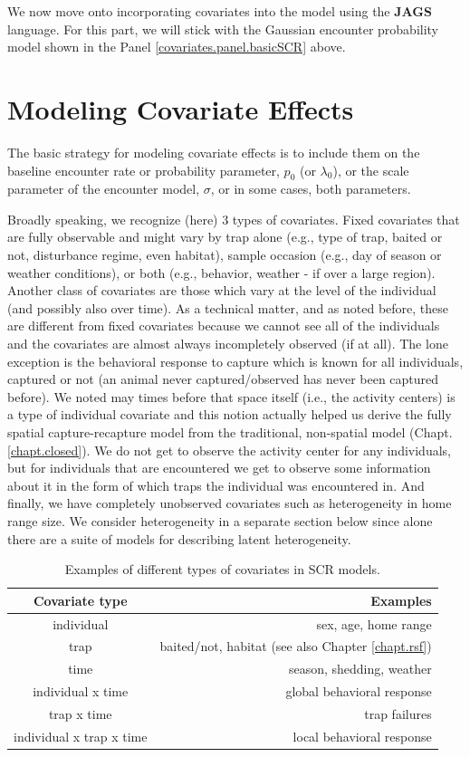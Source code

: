 We  now move onto incorporating
covariates into the model using the {\bf JAGS}
language.  For this part, we will stick with the Gaussian encounter
probability model
 shown in the Panel \ref{covariates.panel.basicSCR} above.

\section{Modeling Covariate Effects}

The basic strategy for modeling covariate effects is to include them
on the baseline encounter rate or probability parameter, $p_{0}$ (or
$\lambda_{0}$), or the scale parameter of the encounter model,
$\sigma$, or in some cases, both parameters.

Broadly speaking, we recognize (here) 3 types of covariates. Fixed
covariates that are fully observable and might vary by trap alone
(e.g., type of trap, baited or not, disturbance regime, even habitat),
sample occasion (e.g., day of season or weather conditions), or both
(e.g., behavior, weather - if over a large region).  Another class
of covariates are those which vary at the level of the individual (and
possibly also over time).  As a technical matter, and as noted before,
these are different from fixed covariates because we cannot see all of
the individuals and the covariates are almost always incompletely
observed (if at all).  The lone exception is the behavioral response
to capture which is known for all individuals, captured or not (an
animal never captured/observed has never been captured before).  We
noted may times before that space itself (i.e., the activity centers)
is a type of individual covariate and this notion actually helped us
derive the fully spatial capture-recapture model from the traditional,
non-spatial model (Chapt. \ref{chapt.closed}). We do not get to observe
the activity center for any individuals, but for individuals that are
encountered we get to observe some information about it in the form of
which traps the individual was encountered in.  And finally, we have
completely unobserved covariates such as heterogeneity in home range
size.  We consider heterogeneity in a separate section below since 
alone there are 
a suite of models for describing  latent heterogeneity. 

\begin{table}[ht]
\centering
\caption{Examples of different types of covariates in SCR models.}
\begin{tabular}{cr}
\hline \hline
Covariate type & Examples \\
\hline
individual & sex, age, home range \\
trap  &  baited/not, habitat (see also Chapter \ref{chapt.rsf}) \\
time  &  season, shedding,  weather  \\
individual x time    &    global behavioral response \\
trap x time     &       trap failures  \\ 
individual x trap x time  &   local behavioral response  \\ \hline
\end{tabular}
\label{covariates.tab.covclass}
\end{table}


